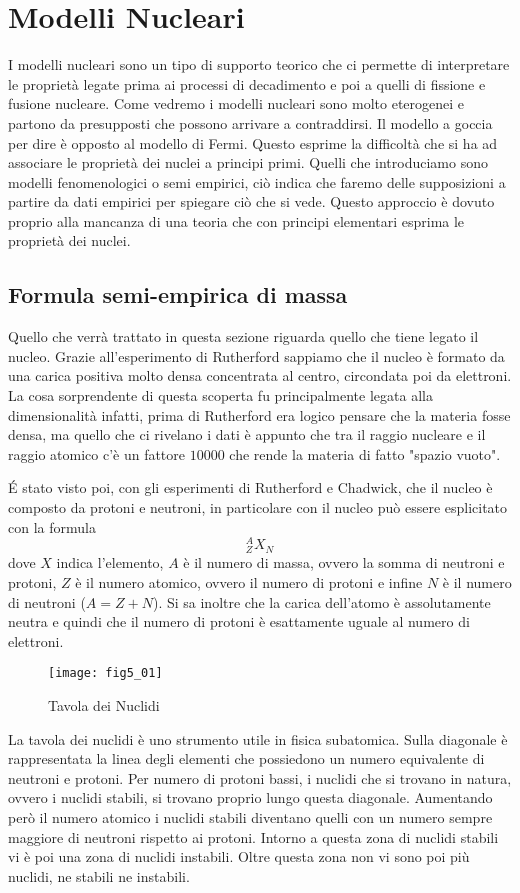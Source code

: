 \section{Modelli Nucleari}
I modelli nucleari sono un tipo di supporto teorico che ci permette di interpretare le proprietà legate prima ai processi di decadimento e poi a quelli di fissione e fusione nucleare.
Come vedremo i modelli nucleari sono molto eterogenei e partono da presupposti che possono arrivare a contraddirsi.
Il modello a goccia per dire è opposto al modello di Fermi.
Questo esprime la difficoltà che si ha ad associare le proprietà dei nuclei a principi primi.
Quelli che introduciamo sono modelli fenomenologici o semi empirici, ciò indica che faremo delle supposizioni a partire da dati empirici per spiegare ciò che si vede.
Questo approccio è dovuto proprio alla mancanza di una teoria che con principi elementari esprima le proprietà dei nuclei.

\subsection{Formula semi-empirica di massa}
Quello che verrà trattato in questa sezione riguarda quello che tiene legato il nucleo. 
Grazie all'esperimento di Rutherford sappiamo che il nucleo è formato da una carica positiva molto densa concentrata al centro, circondata poi da elettroni.
La cosa sorprendente di questa scoperta fu principalmente legata alla dimensionalità infatti, prima di Rutherford era logico pensare che la materia fosse densa, ma quello che ci rivelano i dati è appunto che tra il raggio nucleare e il raggio atomico c'è un fattore $10000$ che rende la materia di fatto "spazio vuoto".

\'E stato visto poi, con gli esperimenti di Rutherford e Chadwick, che il nucleo è composto da protoni e neutroni, in particolare con il nucleo può essere esplicitato con la formula
\begin{equation}
^{A}_{Z}X_{N}
\end{equation}
dove $X$ indica l'elemento, $A$ è il numero di massa, ovvero la somma di neutroni e protoni, $Z$ è il numero atomico, ovvero il numero di protoni e infine $N$ è il numero di neutroni ($A=Z+N$).
Si sa inoltre che la carica dell'atomo è assolutamente neutra e quindi che il numero di protoni è esattamente uguale al numero di elettroni.

\begin{figure}[h]
\centering
\texttt{[image: fig5\_01]}
\caption{Tavola dei Nuclidi}
\label{fig:5_01}
\end{figure}
La tavola dei nuclidi è uno strumento utile in fisica subatomica.
Sulla diagonale è rappresentata la linea degli elementi che possiedono un numero equivalente di neutroni e protoni.
Per numero di protoni bassi, i nuclidi che si trovano in natura, ovvero i nuclidi stabili, si trovano proprio lungo questa diagonale. 
Aumentando però il numero atomico i nuclidi stabili diventano quelli con un numero sempre maggiore di neutroni rispetto ai protoni.
Intorno a questa zona di nuclidi stabili vi è poi una zona di nuclidi instabili.
Oltre questa zona non vi sono poi più nuclidi, ne stabili ne instabili.

